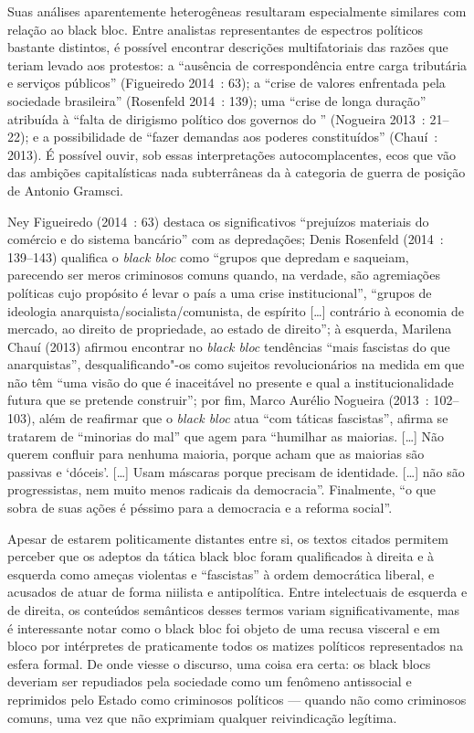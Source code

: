 Suas análises aparentemente heterogêneas resultaram especialmente
similares com relação ao black bloc. Entre analistas representantes de
espectros políticos bastante distintos, é possível encontrar descrições
multifatoriais das razões que teriam levado aos protestos: a ``ausência
de correspondência entre carga tributária e serviços públicos''
(Figueiredo 2014~: 63); a ``crise de valores enfrentada pela sociedade
brasileira'' (Rosenfeld 2014~: 139); uma ``crise de longa duração''
atribuída à ``falta de dirigismo político dos governos do '' (Nogueira
2013~: 21--22); e a possibilidade de ``fazer demandas aos poderes
constituídos'' (Chauí~: 2013). É possível ouvir, sob essas
interpretações autocomplacentes, ecos que vão das ambições
capitalísticas nada subterrâneas da  à categoria de guerra de
posição de Antonio Gramsci.

Ney Figueiredo (2014~: 63) destaca os significativos ``prejuízos
materiais do comércio e do sistema bancário'' com as depredações; Denis
Rosenfeld (2014~: 139--143) qualifica o \emph{black bloc} como ``grupos
que depredam e saqueiam, parecendo ser meros criminosos comuns quando,
na verdade, são agremiações políticas cujo propósito é levar o país a
uma crise institucional'', ``grupos de ideologia
anarquista/socialista/comunista, de espírito {[}\ldots{}{]} contrário à
economia de mercado, ao direito de propriedade, ao estado de direito'';
à esquerda, Marilena Chauí (2013) afirmou encontrar no \emph{black bloc}
tendências ``mais fascistas do que anarquistas'', desqualificando"-os
como sujeitos revolucionários na medida em que não têm ``uma visão do
que é inaceitável no presente e qual a institucionalidade futura que se
pretende construir''; por fim, Marco Aurélio Nogueira (2013~: 102--103),
além de reafirmar que o \emph{black bloc} atua ``com táticas
fascistas'', afirma se tratarem de ``minorias do mal'' que agem para
``humilhar as maiorias. {[}\ldots{}{]} Não querem confluir para nenhuma
maioria, porque acham que as maiorias são passivas e `dóceis'.
{[}\ldots{}{]} Usam máscaras porque precisam de identidade.
{[}\ldots{}{]} não são progressistas, nem muito menos radicais da
democracia''. Finalmente, ``o que sobra de suas ações é
péssimo para a democracia e a reforma social''.

Apesar de estarem politicamente distantes entre si, os textos citados
permitem perceber que os adeptos da tática black bloc foram qualificados
à direita e à esquerda como ameças violentas e ``fascistas'' à ordem
democrática liberal, e acusados de atuar de forma niilista e
antipolítica. Entre intelectuais de esquerda e de direita, os conteúdos
semânticos desses termos variam significativamente, mas é interessante
notar como o black bloc foi objeto de uma recusa visceral e em bloco por
intérpretes de praticamente todos os matizes políticos representados na
esfera formal. De onde viesse o discurso, uma coisa era certa: os black
blocs deveriam ser repudiados pela sociedade como um fenômeno
antissocial e reprimidos pelo Estado como criminosos políticos --- quando
não como criminosos comuns, uma vez que não exprimiam qualquer
reivindicação legítima.

